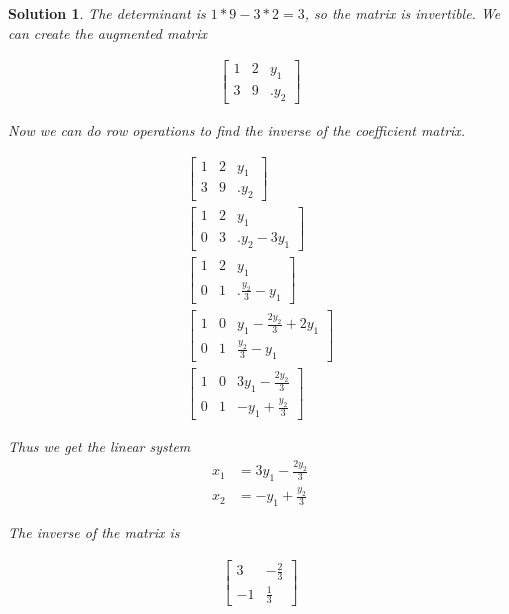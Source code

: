 \documentclass{article}
\newtheorem*{solution}{Solution}
\begin{document}
\begin{solution}
The determinant is $1 * 9 - 3 * 2 = 3$, so the matrix is invertible. We can create the augmented matrix

\begin{align*}
\begin{bmatrix}
1 & 2 & y_{1} \\ 3 & 9 &.y_{2}
\end{bmatrix}
\end{align*}

Now we can do row operations to find the inverse of the coefficient matrix.

\begin{align*}
\begin{bmatrix}
1 & 2 & y_{1} \\ 3 & 9 &.y_{2}
\end{bmatrix} \\
\begin{bmatrix}
1 & 2 & y_{1} \\ 0 & 3 &.y_{2} - 3y_{1}
\end{bmatrix} \\
\begin{bmatrix}
1 & 2 & y_{1} \\ 0 & 1 &.\displaystyle \frac{y_{2}}{3} - y_{1}
\end{bmatrix} \\
\begin{bmatrix}
\displaystyle 1 & 0 & y_{1} - \frac{2y_{2}}{3} + 2y_{1} \\ 0 & 1 & \frac{y_{2}}{3} - y_{1}
\end{bmatrix} \\
\begin{bmatrix}
\displaystyle 1 & 0 & 3y_{1} - \frac{2y_{2}}{3} \\ 0 & 1 & -y_{1} + \frac{y_{2}}{3}
\end{bmatrix} 
\end{align*}

Thus we get the linear system
\begin{align*}
x_{1} &= 3y_{1} - \frac{2y_{2}}{3} \\
x_{2} &= -y_{1} + \frac{y_{2}}{3}
\end{align*}

The inverse of the matrix is

\begin{align*}
\begin{bmatrix}
\displaystyle 3 & -\frac{2}{3} \\
\displaystyle -1 & \frac{1}{3}
\end{bmatrix}
\end{align*}


\end{solution}
\end{document}
